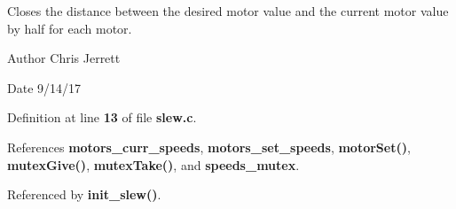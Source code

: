 Closes the distance between the desired motor value and the current motor value by half for each motor. 

\begin{DoxyAuthor}{Author}
Chris Jerrett 
\end{DoxyAuthor}
\begin{DoxyDate}{Date}
9/14/17 
\end{DoxyDate}


Definition at line \textbf{ 13} of file \textbf{ slew.\+c}.



References \textbf{ motors\+\_\+curr\+\_\+speeds}, \textbf{ motors\+\_\+set\+\_\+speeds}, \textbf{ motor\+Set()}, \textbf{ mutex\+Give()}, \textbf{ mutex\+Take()}, and \textbf{ speeds\+\_\+mutex}.



Referenced by \textbf{ init\+\_\+slew()}.


